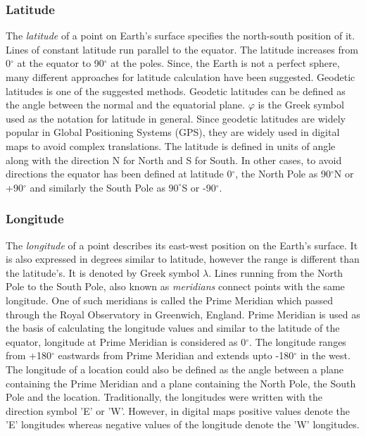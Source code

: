 \subsubsection{Latitude}
The \textit{latitude} of a point on Earth's surface specifies the north-south position of it. Lines of constant latitude run parallel to the equator. The latitude increases from 0$^{\circ}$ at the equator to 90$^{\circ}$ at the poles. Since, the Earth is not a perfect sphere, many different approaches for latitude calculation have been suggested. Geodetic latitudes is one of the suggested methods. Geodetic latitudes can be defined as the angle between the normal and the equatorial plane. $\varphi$ is the Greek symbol used as the notation for latitude in general. Since geodetic latitudes are widely popular in Global Positioning Systems (GPS), they are widely used in digital maps to avoid complex translations. The latitude is defined in units of angle along with the direction N for North and S for South. In other cases, to avoid directions the equator has been defined at latitude 0$^{\circ}$, the North Pole as 90$^{\circ}$N or +90$^{\circ}$ and similarly the South Pole as $90^{\circ}$S or -90$^{\circ}$. 

\subsubsection{Longitude}
The \textit{longitude} of a point describes its east-west position on the Earth's surface. It is also expressed in degrees similar to latitude, however the range is different than the latitude's. It is denoted by Greek symbol $\lambda$. Lines running from the North Pole to the South Pole, also known as \textit{meridians} connect points with the same longitude. One of such meridians is called the Prime Meridian which passed through the Royal Observatory in Greenwich, England. Prime Meridian is used as the basis of calculating the longitude values and similar to the latitude of the equator, longitude at Prime Meridian is considered as 0$^{\circ}$. The longitude ranges from +180$^{\circ}$ eastwards from Prime Meridian and extends upto -180$^{\circ}$ in the west. The longitude of a location could also be defined as the angle between a plane containing the Prime Meridian and a plane containing the North Pole, the South Pole and the location. Traditionally, the longitudes were written with the direction symbol 'E' or 'W'. However, in digital maps positive values denote the 'E' longitudes whereas negative values of the longitude denote the 'W' longitudes.

